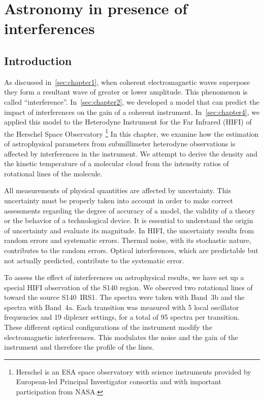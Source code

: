 \cleardoublepage
\chapter{Astronomy in presence of interferences}
\label{sec:chapter5}

\section{Introduction}

As discussed in~\cref{sec:chapter1}, when coherent electromagnetic waves superpose they form a resultant wave of greater or lower amplitude.
This phenomenon is called ``interference''.
In~\cref{sec:chapter2}, we developed a model that can predict the impact of interferences on the gain of a coherent instrument.
In~\cref{sec:chapter4}, we applied this model to the Heterodyne Instrument for the Far Infrared (HIFI) of the Herschel Space Observatory%
\footnote{
    Herschel is an ESA space observatory with science instruments provided by European-led Principal Investigator consortia and with important participation from NASA.
}
In this chapter, we examine how the estimation of astrophysical parameters from submillimeter heterodyne observations is affected by interferences in the instrument.
We attempt to derive the density and the kinetic temperature of a molecular cloud from the intensity ratios of rotational lines of the  molecule.

All measurements of physical quantities are affected by uncertainty.
This uncertainty must be properly taken into account in order to make correct assessments regarding the degree of accuracy of a model, the validity of a theory or the behavior of a technological device.
It is essential to understand the origin of uncertainty and evaluate its magnitude.
In HIFI, the uncertainty results from random errors and systematic errors.
Thermal noise, with its stochastic nature, contributes to the random errors.
Optical interferences, which are predictable but not actually predicted, contribute to the systematic error.

To assess the effect of interferences on astrophysical results, we have set up a special HIFI observation of the S140 region.
We observed two rotational lines of~ toward the source S140~IRS1.
The  spectra were taken with Band~3b and the  spectra with Band~4a.
Each transition was measured with 5 local oscillator frequencies and 19 diplexer settings, for a total of 95 spectra per transition.
These different optical configurations of the instrument modify the electromagnetic interferences.
This modulates the noise and the gain of the instrument and therefore the profile of the lines.

